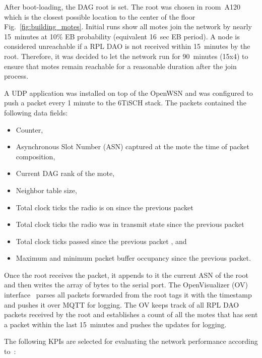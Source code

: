 \documentclass[sensors,article,submit,moreauthors,pdftex]{Definitions/mdpi}
\begin{document}

After boot-loading, the DAG root is set.
The root was chosen in room~A120 which is the closest possible location to the center of the floor Fig.~\ref{fig:building_motes}.
Initial runs show all motes join the network by nearly 15~minutes at 10\% EB probability (equivalent 16~sec EB period).
A node is considered unreachable if a RPL DAO is not received within 15~minutes by the root.
Therefore, it was decided to let the network run for 90~minutes (15x4) to ensure that motes remain reachable for a reasonable duration after the join process. 


A UDP application was installed on top of the OpenWSN and was configured to push a packet every 1 minute to the 6TiSCH stack. 
The packets contained the following data fields:

\begin{itemize}
    \item Counter,
    \item Asynchronous Slot Number (ASN) captured at the mote the time of packet composition,
    \item Current DAG rank of the mote,
    \item Neighbor table size,
    \item Total clock ticks the radio is on since the previous packet
    \item Total clock ticks the radio was in transmit state since the previous packet
    \item Total clock ticks passed since the previous packet , and
    \item Maximum and minimum packet buffer occupancy since the previous packet.
\end{itemize}

Once the root receives the packet, it appends to it the current ASN of the root and then writes the array of bytes to the serial port.
The OpenVisualizer (OV) interface~\cite{munoz19opentestbed} parses all packets forwarded from the root tags it with the timestamp and pushes it over MQTT for logging.
The OV keeps track of all RPL DAO packets received by the root and establishes a count of all the motes that has sent a packet within the last 15~minutes and pushes the updates for logging. 


The following KPIs are selected for evaluating the network performance according to~\cite{vucinic20key}:
\end{document}
